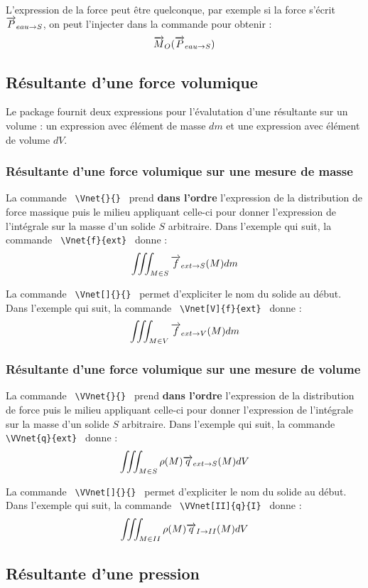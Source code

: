 \documentclass[12pt]{article}
\begin{document}
L'expression de la force peut être quelconque, par exemple si la force s'écrit $\Vct{P}_{eau \rightarrow S}$, on peut l'injecter dans la commande pour obtenir : $$\Gmoment{\Vct{P}_{eau \rightarrow S}}{O}$$

\subsection{Résultante d'une force volumique}

Le package fournit deux expressions pour l'évalutation d'une résultante sur un volume : un expression avec élément de masse $dm$ et une expression avec élément de volume $dV$.

\subsubsection{Résultante d'une force volumique sur une mesure de masse}

La commande \verb| \Vnet{}{} | prend \textbf{dans l'ordre} l'expression de la distribution de force massique puis le milieu appliquant celle-ci pour donner l'expression de l'intégrale sur la masse d'un solide $S$ arbitraire. Dans l'exemple qui suit, la commande \verb| \Vnet{f}{ext} | donne : $$\Vnet{f}{ext}$$

La commande \verb| \Vnet[]{}{} | permet d'expliciter le nom du solide au début. Dans l'exemple qui suit, la commande \verb| \Vnet[V]{f}{ext} | donne : $$\Vnet[V]{f}{ext}$$

\subsubsection{Résultante d'une force volumique sur une mesure de volume}

La commande \verb| \VVnet{}{} | prend \textbf{dans l'ordre} l'expression de la distribution de force puis le milieu appliquant celle-ci pour donner l'expression de l'intégrale sur la masse d'un solide $S$ arbitraire. Dans l'exemple qui suit, la commande \verb| \VVnet{q}{ext} | donne : $$\VVnet{q}{ext}$$

La commande \verb| \VVnet[]{}{} | permet d'expliciter le nom du solide au début. Dans l'exemple qui suit, la commande \verb| \VVnet[II]{q}{I} | donne : $$\VVnet[II]{q}{I}$$

\subsection{Résultante d'une pression}
\end{document}
